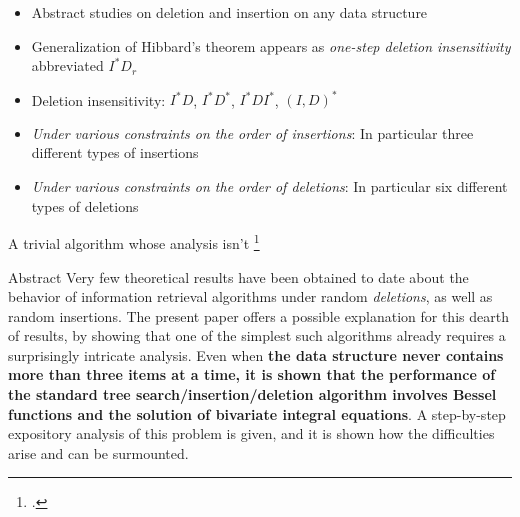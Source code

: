 \documentclass{beamer}
\begin{document}
\begin{frame}
    \begin{itemize}
        \item Abstract studies on deletion and insertion on any data structure
            \pause
        \item Generalization of Hibbard's theorem appears as \textit{one-step deletion insensitivity} abbreviated $I^* D_r$
            \pause
        \item Deletion insensitivity: $I^*D$, $I^*D^*$, $I^*DI^*$, $(I,D)^*$
            \pause
        \item \textit{Under various constraints on the order of insertions}: In particular three different types of insertions
        \item \textit{Under various constraints on the order of deletions}: In particular six different types of deletions
    \end{itemize}
\end{frame}


\begin{frame}{A trivial algorithm whose analysis isn't \footcite{jonassen1978trivial}}
    \begin{block}{Abstract}
        Very few theoretical results have been obtained to date about the behavior of information retrieval algorithms under random \textit{deletions}, as well as random insertions. The present paper offers a possible explanation for this dearth of results, by showing that one of the simplest such algorithms already requires a surprisingly intricate analysis. Even when \textbf{the data structure never contains more than three items at a time, it is shown that the performance of the standard tree search/insertion/deletion algorithm involves Bessel functions and the solution of bivariate integral equations}. A step-by-step expository analysis of this problem is given, and it is shown how the difficulties arise and can be surmounted.
    \end{block}
\end{frame}
\end{document}

